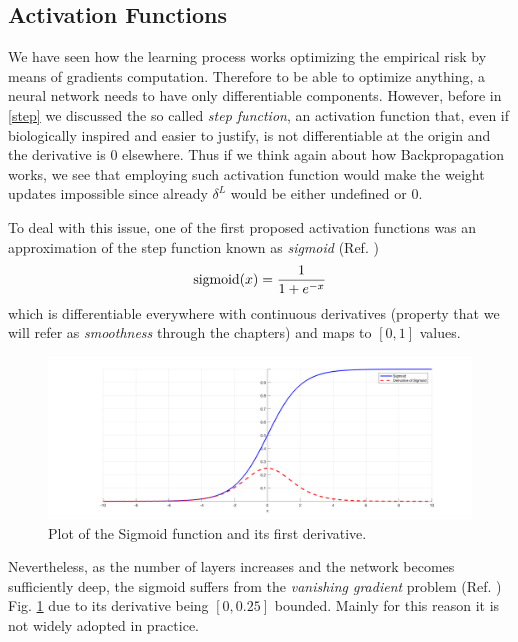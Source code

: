 \documentclass[LaM,binding=0.6cm]{./packages/sapthesis/sapthesis}
\begin{document}
        \subsection{Activation Functions}
            
            We have seen how the learning process works optimizing the empirical risk by means of gradients computation.
            Therefore to be able to optimize anything, a neural network needs to have only differentiable components.
            However, before in \ref{step} we discussed the so called \textit{step function}, an activation function that, 
            even if biologically inspired and easier to justify, is not differentiable at the origin and the derivative is 0 elsewhere.
            Thus if we think again about how Backpropagation works, we see that employing such activation function would make the weight updates impossible
            since already $ \delta^{L} $ would be either undefined or 0.

            To deal with this issue, one of the first proposed activation functions was an approximation of the step function known as \textit{sigmoid} (Ref. ) 
            \begin{equation}
                \textnormal{sigmoid}(x) = \frac{1}{1 + e^{-x}}
            \end{equation}
            which is differentiable everywhere with continuous derivatives (property that we will refer as \textit{smoothness} through the chapters) and
            maps to $ [0, 1] $ values.
            \begin{figure}[h]
                \centering
                \includegraphics[width=1\textwidth]{sig_der}
                \caption{Plot of the Sigmoid function and its first derivative.}
                \label{fig:sigmoid}
            \end{figure}
            Nevertheless, as the number of layers increases and the network becomes sufficiently deep, the sigmoid suffers from the \textit{vanishing gradient} problem (Ref. ) Fig. \ref{fig:sigmoid}
            due to its derivative being $[0, 0.25]$ bounded. Mainly for this reason it is not widely adopted in practice.
\end{document}
